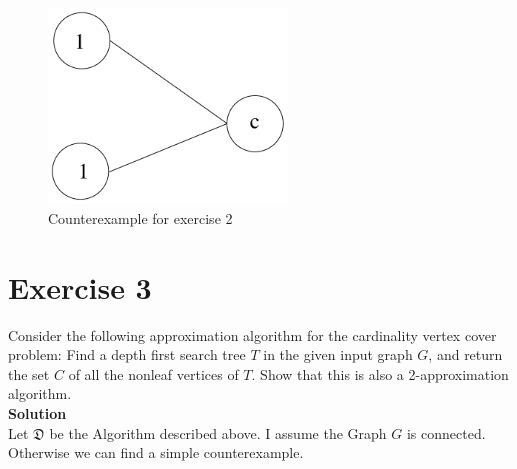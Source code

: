 \documentclass[11pt,a4paper,ngerman]{article}
\begin{document}
\begin{figure}[!h]
	\centering
	\includegraphics[width=2.5in]{ex2_counter}
	\caption{Counterexample for exercise 2}
	\label{fig:2counter}
\end{figure}


\section*{Exercise 3}
Consider the following approximation algorithm for the cardinality vertex cover problem: Find a depth first search tree $T$ in the given input graph $G$, and return the set $C$ of all the nonleaf vertices of $T$. Show that this is also a 2-approximation algorithm.\\

\textbf{Solution}\\
Let $\mathfrak{D}$ be the Algorithm described above. I assume the Graph $G$ is connected. Otherwise we can find a simple counterexample.
\end{document}
